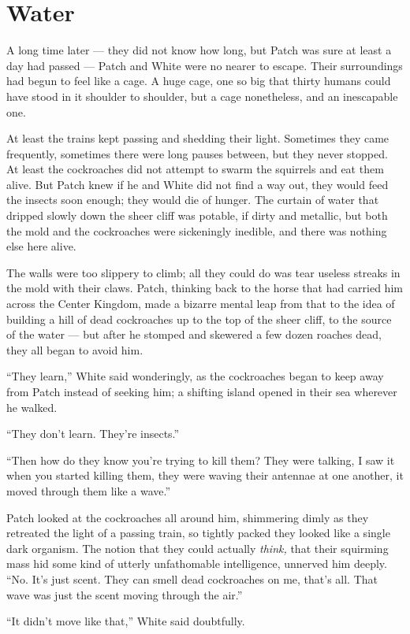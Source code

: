 \documentclass[ebook,oneside,openany,17pt]{memoir}
\renewcommand{\thechapter}{\Roman{chapter}}
\newcounter{sections}
\newcommand{\sections}[1]{%
  \section*{#1}
  \addtocounter{sections}{1}%
  \pdfbookmark[1]{#1}{section.\thechapter.\thesections}}
\begin{document}

\sections{Water}

A long time later — they did not know how long, but Patch was sure at
least a day had passed — Patch and White were no nearer to
escape. Their surroundings had begun to feel like a cage. A huge cage,
one so big that thirty humans could have stood in it shoulder to
shoulder, but a cage nonetheless, and an inescapable one.

At least the trains kept passing and shedding their light. Sometimes
they came frequently, sometimes there were long pauses between, but
they never stopped. At least the cockroaches did not attempt to swarm
the squirrels and eat them alive. But Patch knew if he and White did
not find a way out, they would feed the insects soon enough; they
would die of hunger. The curtain of water that dripped slowly down the
sheer cliff was potable, if dirty and metallic, but both the mold and
the cockroaches were sickeningly inedible, and there was nothing else
here alive.

The walls were too slippery to climb; all they could do was tear
useless streaks in the mold with their claws. Patch, thinking back to
the horse that had carried him across the Center Kingdom, made a
bizarre mental leap from that to the idea of building a hill of dead
cockroaches up to the top of the sheer cliff, to the source of the
water — but after he stomped and skewered a few dozen roaches dead,
they all began to avoid him.

“They learn,” White said wonderingly, as the cockroaches began to keep
away from Patch instead of seeking him; a shifting island opened in
their sea wherever he walked.

“They don’t learn. They’re insects.”

“Then how do they know you’re trying to kill them? They were talking,
I saw it when you started killing them, they were waving their
antennae at one another, it moved through them like a wave.”

Patch looked at the cockroaches all around him, shimmering dimly as
they retreated the light of a passing train, so tightly packed they
looked like a single dark organism. The notion that they could
actually \emph{think,} that their squirming mass hid some kind of
utterly unfathomable intelligence, unnerved him deeply. “No. It’s just
scent. They can smell dead cockroaches on me, that’s all. That wave
was just the scent moving through the air.”

“It didn’t move like that,” White said doubtfully.
\end{document}
